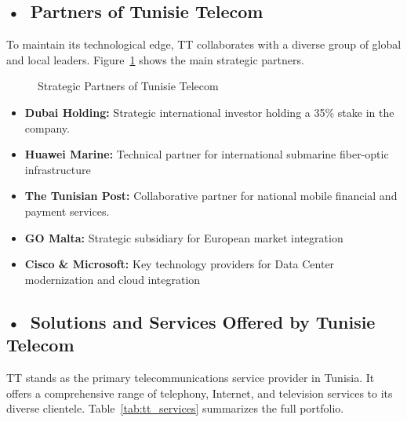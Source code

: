 \subsection*{\mbox{•}~Partners of Tunisie Telecom}
To maintain its technological edge, TT\cite{Tunisie_Telecom} collaborates with a diverse group of global and local leaders. Figure~\ref{fig:partners} shows the main strategic partners.

\begin{figure}[htbp]
    \centering
    \PratnerGrid
    \caption{Strategic Partners of Tunisie Telecom}
    \label{fig:partners}
\end{figure}

\begin{itemize}
    \item \textbf{Dubai Holding:} Strategic international investor holding a 35\% stake in the company.
    \item \textbf{Huawei Marine:} Technical partner for international submarine fiber-optic infrastructure
    \item \textbf{The Tunisian Post:} Collaborative partner for national mobile financial and payment services.
    \item \textbf{GO Malta:} Strategic subsidiary for European market integration
    \item \textbf{Cisco \& Microsoft:} Key technology providers for Data Center modernization and cloud integration 
\end{itemize}

\subsection*{\mbox{•}~Solutions and Services Offered by Tunisie Telecom}
TT\cite{Tunisie_Telecom} stands as the primary telecommunications service provider in Tunisia. It offers a comprehensive range of telephony, Internet, and television services to its diverse clientele. Table~\ref{tab:tt_services} summarizes the full portfolio.

